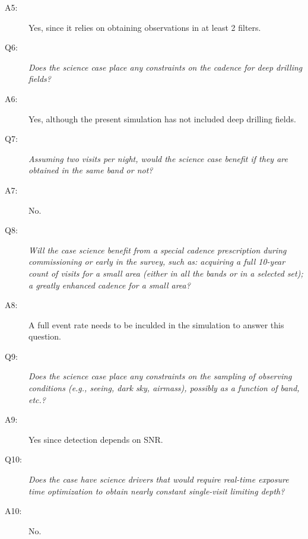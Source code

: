 \begin{description}
 \item[A5:] Yes, since it relies on obtaining observations in at least 2 filters.

 \item[Q6:] {\it Does the science case place any constraints on the
 cadence for deep drilling fields?}

 \item[A6:] Yes, although the present simulation has not included deep drilling fields.

 \item[Q7:] {\it Assuming two visits per night, would the science case
 benefit if they are obtained in the same band or not?}

 \item[A7:] No.

 \item[Q8:] {\it Will the case science benefit from a special cadence
 prescription during commissioning or early in the survey, such as:
 acquiring a full 10-year count of visits for a small area (either in all
 the bands or in a  selected set); a greatly enhanced cadence for a small
 area?}

 \item[A8:] A full event rate needs to be inculded in the simulation to answer this question.

 \item[Q9:] {\it Does the science case place any constraints on the
 sampling of observing conditions (e.g., seeing, dark sky, airmass),
 possibly as a function of band, etc.?}

 \item[A9:] Yes since detection depends on SNR.

 \item[Q10:] {\it Does the case have science drivers that would require
 real-time exposure time optimization to obtain nearly constant
 single-visit limiting depth?}

 \item[A10:] No.

 \end{description}
